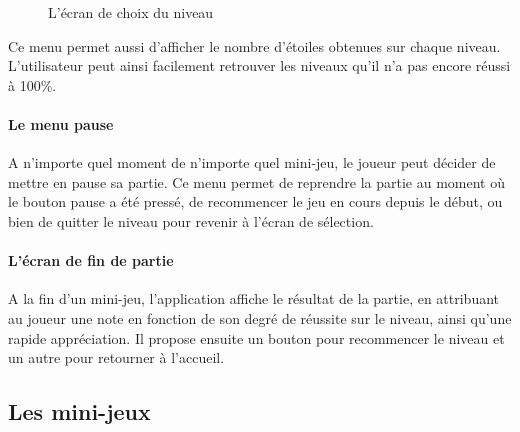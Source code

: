 \begin{figure}[H]\centering
  \caption{L'écran de choix du niveau}
  \label{analytics}
\end{figure}

Ce menu permet aussi d'afficher le nombre d'étoiles obtenues sur chaque niveau. L'utilisateur peut ainsi facilement retrouver les niveaux qu'il n'a pas encore réussi à 100\%.

\paragraph{Le menu pause}

A n'importe quel moment de n'importe quel mini-jeu, le joueur peut décider de mettre en pause sa partie. Ce menu permet de reprendre la partie au moment où le bouton pause a été pressé, de recommencer le jeu en cours depuis le début, ou bien de quitter le niveau pour revenir à l'écran de sélection.

\paragraph{L'écran de fin de partie}

A la fin d'un mini-jeu, l'application affiche le résultat de la partie, en attribuant au joueur une note en fonction de son degré de réussite sur le niveau, ainsi qu'une rapide appréciation. Il propose ensuite un bouton pour recommencer le niveau et un autre pour retourner à l'accueil.

\subsection{Les mini-jeux}

